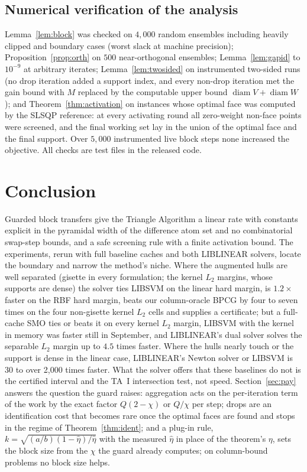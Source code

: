 \documentclass[pdflatex,sn-apa]{sn-jnl}%
\theoremstyle{thmstyleone}
\theoremstyle{thmstyletwo}
\begin{document}
\subsection{Numerical verification of the analysis}\label{app:num}
Lemma~\ref{lem:block} was checked on $4{,}000$ random ensembles
including heavily clipped and boundary cases (worst slack at machine
precision); Proposition~\ref{prop:orth} on $500$ near-orthogonal
ensembles; Lemma~\ref{lem:gapid} to $10^{-9}$ at arbitrary iterates;
Lemma~\ref{lem:twosided} on instrumented two-sided runs (no drop
iteration added a support index, and every non-drop iteration met the
gain bound with $M$ replaced by the computable upper bound
$\operatorname{diam}V+\operatorname{diam}W$); and Theorem~\ref{thm:activation} on instances whose optimal
face was computed by the SLSQP reference: at every activating round all
zero-weight non-face points were screened, and the final working set
lay in the union of the optimal face and the final support. Over $5{,}000$ instrumented live
block steps none increased the objective. All checks are test files in
the released code.



\section{Conclusion}
Guarded block transfers give the Triangle Algorithm a linear rate with
constants explicit in the pyramidal width of the difference atom set
and no combinatorial swap-step bounds, and a safe screening rule with a
finite activation bound. The experiments, rerun with full baseline
caches and both LIBLINEAR solvers, locate the boundary and narrow the
method's niche. Where the augmented hulls are well separated (gisette
in every formulation; the kernel $L_2$ margins, whose supports are
dense) the solver ties LIBSVM on the linear hard margin, is $1.2\times$
faster on the RBF hard margin, beats our column-oracle BPCG by four to
seven times on the four non-gisette kernel $L_2$ cells and supplies a
certificate; but a full-cache SMO ties or
beats it on every kernel $L_2$ margin, LIBSVM with the kernel in memory was faster still in September, and LIBLINEAR's dual solver solves the separable $L_2$
margin up to $4.5$ times faster. Where the hulls nearly touch or the
support is dense in the linear case, LIBLINEAR's Newton solver or
LIBSVM is 30 to over 2,000 times faster. What the solver offers that these
baselines do not is the certified interval and the TA~I intersection
test, not speed. Section~\ref{sec:pay} answers the question the guard
raises: aggregation acts on the per-iteration term of the work
by the exact factor $Q(2-\chi)$ or $Q/\chi$ per step; drops are an
identification cost that becomes rare once the optimal faces are found
and stops in the regime of Theorem~\ref{thm:ident}; and a plug-in rule, $k=\sqrt{(a/b)(1-\hat\eta)/\hat\eta}$ with the measured
$\hat\eta$ in place of the theorem's $\eta$, sets the block size from the
$\chi$ the guard already computes; on column-bound problems no block
size helps.
\end{document}
